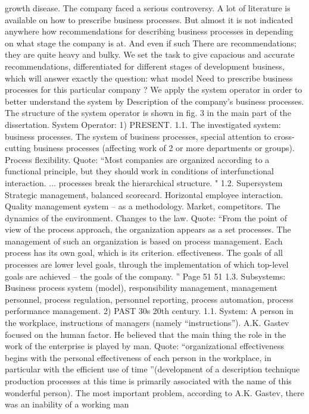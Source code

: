 growth disease. The company faced a serious controversy.
A lot of literature is available on how to prescribe business processes. But almost
it is not indicated anywhere how recommendations for describing business processes in
depending on what stage the company is at. And even if such
There are recommendations; they are quite heavy and bulky. We set the task to give
capacious and accurate recommendations, differentiated for different stages of development
business, which will answer exactly the question: what model
Need to prescribe business processes for this particular company ?
We apply the system operator in order to better understand the system by
Description of the company's business processes. The structure of the system operator is shown in
fig. 3 in the main part of the dissertation.
System Operator:
1) PRESENT.
1.1. The investigated system: business processes.
The system of business processes, special attention to cross-cutting business processes (affecting
work of 2 or more departments or groups). Process flexibility.
Quote: “Most companies are organized according to a functional principle, but they
should work in conditions of interfunctional interaction. ... processes
break the hierarchical structure. "
1.2. Supersystem
Strategic management, balanced scorecard. Horizontal
employee interaction. Quality management system -- as a methodology. Market,
competitors. The dynamics of the environment. Changes to the law.
Quote: “From the point of view of the process approach, the organization appears as a set
processes. The management of such an organization is based on process management.
Each process has its own goal, which is its criterion.
effectiveness. The goals of all processes are lower level goals, through
the implementation of which top-level goals are achieved -- the goals of the company. ”
Page 51
51
1.3. Subsystems:
Business process system (model), responsibility management, management
personnel, process regulation, personnel reporting, process automation,
process performance management.
2) PAST 30s 20th century.
1.1.
System:
A person in the workplace, instructions of managers (namely “instructions”).
A.K. Gastev focused on the human factor. He believed that the main thing
the role in the work of the enterprise is played by man. Quote: “organizational effectiveness
begins with the personal effectiveness of each person in the workplace, in particular
with the efficient use of time ”(development of a description technique
production processes at this time is primarily associated with the name of this
wonderful person).
The most important problem, according to A.K. Gastev, there was an inability of a working man
